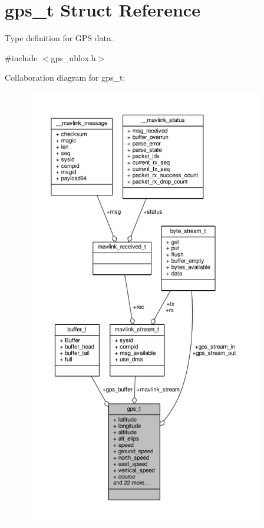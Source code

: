 \hypertarget{structgps__t}{\section{gps\+\_\+t Struct Reference}
\label{structgps__t}
}


Type definition for G\+P\+S data.  




{\ttfamily \#include $<$gps\+\_\+ublox.\+h$>$}



Collaboration diagram for gps\+\_\+t\+:
\nopagebreak
\begin{figure}[H]
\begin{center}
\leavevmode
\includegraphics[height=550pt]{structgps__t__coll__graph}
\end{center}
\end{figure}
